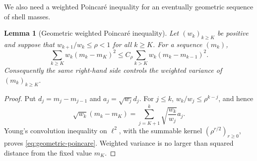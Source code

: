 \documentclass[11pt]{article}
\newtheorem{lemma}[theorem]{Lemma}
\theoremstyle{definition}
\theoremstyle{remark}
\begin{document}
We also need a weighted Poincar\'e inequality for an eventually geometric
sequence of shell masses.

\begin{lemma}[Geometric weighted Poincar\'e inequality]
\label{lem:geometric-poincare}
Let $(w_k)_{k\ge K}$ be positive and suppose that
$w_{k+1}/w_k\le\rho<1$ for all $k\ge K$.  For a sequence $(m_k)$,
\begin{equation}
 \sum_{k\ge K}w_k(m_k-m_K)^2
 \le C_\rho\sum_{k>K}w_k(m_k-m_{k-1})^2.
 \label{eq:geometric-poincare}
\end{equation}
Consequently the same right-hand side controls the weighted variance of
$(m_k)_{k\ge K}$.
\end{lemma}

\begin{proof}
Put $d_j=m_j-m_{j-1}$ and $a_j=\sqrt{w_j}d_j$.  For $j\le k$,
$w_k/w_j\le\rho^{k-j}$, and hence
\[
 \sqrt{w_k}(m_k-m_K)
 =\sum_{j=K+1}^k\sqrt{\frac{w_k}{w_j}}a_j.
\]
Young's convolution inequality on $\ell^2$, with the summable kernel
$(\rho^{r/2})_{r\ge0}$, proves \eqref{eq:geometric-poincare}.  Weighted
variance is no larger than squared distance from the fixed value $m_K$.
\end{proof}
\end{document}
